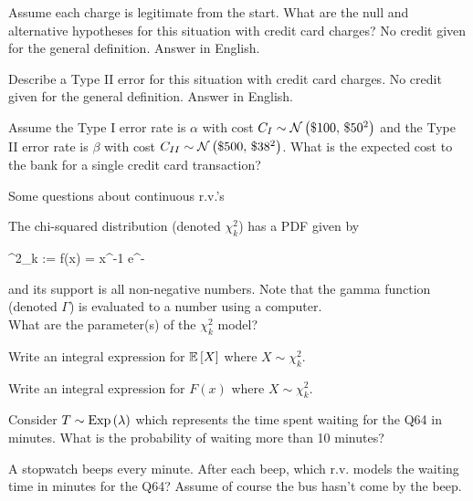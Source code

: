\documentclass[12pt]{article}
\begin{document}
\benum

 Assume each charge is legitimate from the start. What are the null and alternative hypotheses for this situation with credit card charges? No credit given for the general definition. Answer in English. 


 Describe a Type II error for this situation with credit card charges. No credit given for the general definition. Answer in English. 

 Assume the Type I error rate is $\alpha$ with cost $C_I \sim \mathcal{N}\left(\$100,\,\$50^2\right)$ and the Type II error rate is $\beta$ with cost $C_{II} \sim \mathcal{N}\left(\$500,\,\$38^2\right)$. What is the expected cost to the bank for a single credit card transaction? 



\eenum



\problem Some questions about continuous r.v.'s

\benum


 The chi-squared distribution (denoted $\chi^2_k$) has a PDF given by

\beqn
\chi^2_k := f(x) = \; x^{-1} e^{-}
\eeqn 

and its support is all non-negative numbers. Note that the gamma function (denoted $\Gamma$) is evaluated to a number using a computer.  \\

What are the parameter(s) of the $\chi^2_k$ model?

 Write an integral expression for $\mathbb{E}\left[X\right]$ where $X \sim  \chi^2_k$. 

 Write an integral expression for $F(x)$ where $X \sim  \chi^2_k$. 

 Consider $T \sim \mathrm{Exp}\left(\lambda\right)$ which represents the time spent waiting for the Q64 in minutes. What is the probability of waiting more than 10 minutes? 

 A stopwatch beeps every minute. After each beep, which r.v. models the waiting time in minutes for the Q64? Assume of course the bus hasn't come by the beep.  


\eenum
\end{document}
